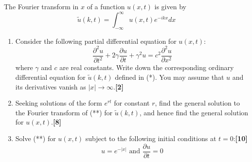 \documentclass[a4paper]{article}
\begin{document}
\begin{qns}
The Fourier transform in $x$ of a function $u(x, t)$ is given by
\begin{equation}
    \tilde{u}(k,t)=\int_{-\infty}^\infty u(x,t)e^{-ikx}dx\tag{*}
\end{equation}
\begin{enumerate}[label=(\roman*)]
\item Consider the following partial differential equation for $u(x, t)$:
\begin{equation}
    \frac{\partial^2u}{\partial t^2}+2\gamma\frac{\partial u}{\partial t}+\gamma^2u=c^2\frac{\partial^2u}{\partial x^2}\tag{**}
\end{equation}
where $\gamma$ and $c$ are real constants. Write down the corresponding ordinary differential equation for $\tilde{u}(k,t)$ defined in (*). You may assume that $u$ and its derivatives vanish
as $|x|\rightarrow\infty$.\hfill\textbf{[2]}
\item Seeking solutions of the form $e^{rt}$ for constant $r$, find the general solution to the Fourier transform of (**) for $\tilde{u}(k, t)$, and hence find the general solution for $u(x, t)$.\hfill\textbf{[8]}
\item Solve (**) for $u(x, t)$ subject to the following initial conditions at $t = 0$:\hfill\textbf{[10]}
$$u=e^{-|x|}\text{ and }\frac{\partial u}{\partial t}=0$$
\end{enumerate}
\end{qns}
\newpage
\end{document}

